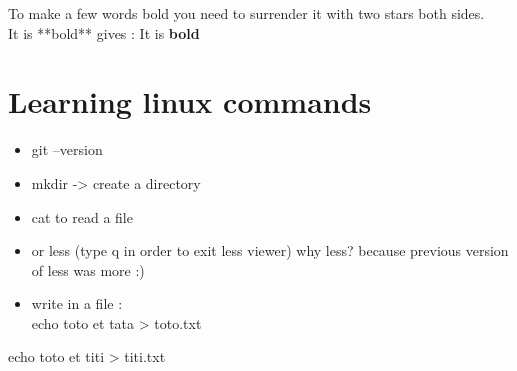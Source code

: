 \documentclass[
]{book}
\begin{document}
To make a few words bold you need to surrender it with two stars both sides.\\
It is **bold** gives : It is \textbf{bold}

\hypertarget{learning-linux-commands}{%
\chapter{Learning linux commands}\label{learning-linux-commands}}

\begin{itemize}
\item
  git --version
\item
  mkdir -\textgreater{} create a directory
\item
  cat to read a file
\item
  or less (type q in order to exit less viewer)
  why less? because previous version of less was more :)
\item
  write in a file :\\
  echo toto et tata \textgreater{} toto.txt
\end{itemize}

echo toto et titi \textgreater{} titi.txt
\end{document}
